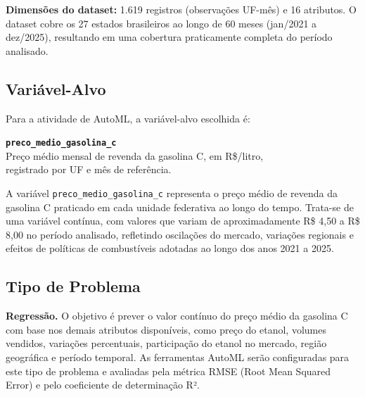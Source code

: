 \documentclass[11pt, a4paper, oneside]{article}
\begin{document}
\begin{infobox}
\textbf{Dimensões do dataset:} 1.619 registros (observações UF-mês) e 16 atributos.
O dataset cobre os 27 estados brasileiros ao longo de 60 meses (jan/2021 a dez/2025),
resultando em uma cobertura praticamente completa do período analisado.
\end{infobox}

\subsection{Variável-Alvo}
\label{sec:dataset-target}

Para a atividade de AutoML, a variável-alvo escolhida é:

\begin{center}
  \begin{tcolorbox}[
    colback=tableheadlight,
    colframe=ueagreen,
    arc=2mm,
    boxrule=1.5pt,
    leftrule=4pt,
    width=0.85\textwidth,
    enhanced
  ]
    \centering
    \textbf{\large \texttt{preco\_medio\_gasolina\_c}}\\[2mm]
    \small Preço médio mensal de revenda da gasolina C, em R\$/litro,\\
    registrado por UF e mês de referência.
  \end{tcolorbox}
\end{center}

\vspace{4mm}

A variável \texttt{preco\_medio\_gasolina\_c} representa o preço médio de revenda da
gasolina C praticado em cada unidade federativa ao longo do tempo. Trata-se de uma
variável contínua, com valores que variam de aproximadamente R\$ 4,50 a R\$ 8,00
no período analisado, refletindo oscilações do mercado, variações regionais e efeitos
de políticas de combustíveis adotadas ao longo dos anos 2021 a 2025.

\subsection{Tipo de Problema}
\label{sec:dataset-tipo}

\textbf{Regressão.} O objetivo é prever o valor contínuo do preço médio da gasolina C
com base nos demais atributos disponíveis, como preço do etanol, volumes vendidos,
variações percentuais, participação do etanol no mercado, região geográfica e período
temporal. As ferramentas AutoML serão configuradas para este tipo de problema e
avaliadas pela métrica RMSE (Root Mean Squared Error) e pelo coeficiente de
determinação R².
\end{document}
